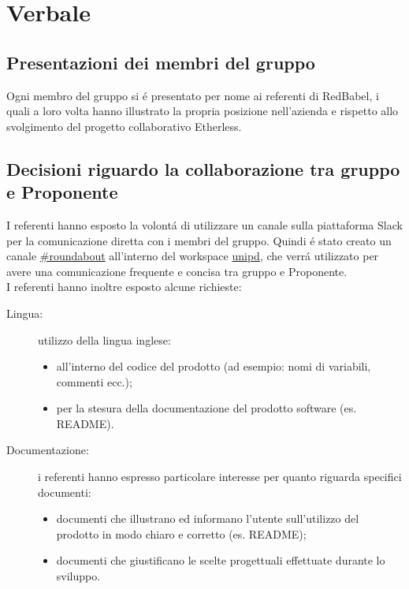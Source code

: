 \section{Verbale}
\subsection{Presentazioni dei membri del gruppo \Gruppo}
Ogni membro del gruppo \Gruppo{} si é presentato per nome ai referenti di RedBabel, i quali a loro volta hanno illustrato la propria posizione nell'azienda e rispetto allo svolgimento del progetto collaborativo Etherless.

\subsection{Decisioni riguardo la collaborazione tra gruppo e Proponente}
I referenti hanno esposto la volontá di utilizzare un canale sulla piattaforma %
Slack per la comunicazione diretta con i membri del gruppo. Quindi é stato creato un canale \href{https://app.slack.com/client/T38RC2RNJ/C010A7JDJBH}{\#roundabout} all'interno del workspace \href{https://unipd-math.slack.com}{unipd}, che verrá utilizzato per avere una comunicazione frequente e concisa tra gruppo e Proponente.\\
I referenti hanno inoltre esposto alcune richieste:
\begin{description}
	\item[Lingua:] utilizzo della lingua inglese:
		\begin{itemize}
			\item all'interno del codice del prodotto (ad esempio: nomi di variabili, commenti ecc.);
			\item per la stesura della documentazione del prodotto software (es. README).
		\end{itemize}
	\item[Documentazione:] i referenti hanno espresso particolare interesse per quanto riguarda specifici documenti:
		\begin{itemize}
			\item documenti che illustrano ed informano l'utente sull'utilizzo del prodotto in modo chiaro e corretto (es. README);
			\item documenti che giustificano le scelte progettuali effettuate durante lo sviluppo.
		\end{itemize}
\end{description}


